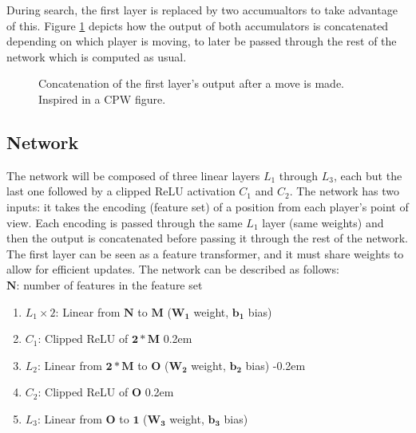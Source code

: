 During search, the first layer is replaced by two accumualtors to take advantage of this. Figure \ref{fig:incr_update} depicts how the output of both accumulators is concatenated depending on which player is moving, to later be passed through the rest of the network which is computed as usual. 

\begin{figure}[H]
\centering
{}
\caption{Concatenation of the first layer's output after a move is made. Inspired in a CPW figure.}
\label{fig:incr_update}
\end{figure}

\subsection{Network}

The network will be composed of three linear layers $L_1$ through $L_3$, each but the last one followed by a clipped ReLU activation $C_1$ and $C_2$. The network has two inputs: it takes the encoding (feature set) of a position from each player's point of view. Each encoding is passed through the same $L_1$ layer (same weights) and then the output is concatenated before passing it through the rest of the network. The first layer can be seen as a feature transformer, and it must share weights to allow for efficient updates. The network can be described as follows: \\

$\bm{N}$: number of features in the feature set

\begin{enumerate}
\itemsep-0.2em
\item $L_1 \times 2$: Linear from $\bm{N}$ to $\bm{M}$ ($\bm{W_1}$ weight, $\bm{b_1}$ bias)
\item $C_1$: Clipped ReLU of $\bm{2 * M}$
\itemsep0.2em
\item $L_2$: Linear from $\bm{2 * M}$ to $\bm{O}$ ($\bm{W_2}$ weight, $\bm{b_2}$ bias)
\itemsep-0.2em
\item $C_2$: Clipped ReLU of $\bm{O}$
\itemsep0.2em
\item $L_3$: Linear from $\bm{O}$ to $\bm{1}$ ($\bm{W_3}$ weight, $\bm{b_3}$ bias)
\end{enumerate}


